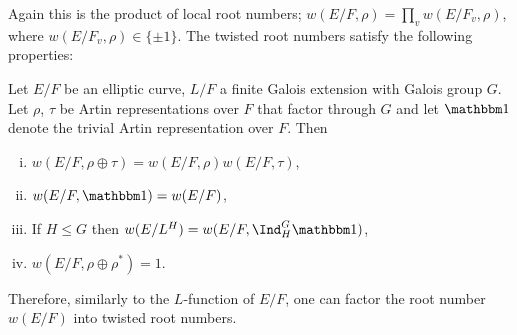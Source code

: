 Again this is the product of local root numbers; $w(E / F, \rho) = \prod_v w(E / F_v, \rho)$, where $w(E / F_v, \rho) \in \{ \pm 1\}$. The twisted root numbers satisfy the following properties:

\begin{prop}\cite[Lemma A.1, Proposition A.2]{reg-const}\label{compute-root-twist}
    Let $E / F$ be an elliptic curve, $L / F$ a finite Galois extension with Galois group $G$. Let $\rho$, $\tau$ be Artin representations over $F$ that factor through $G$ and let $\trivial$ denote the trivial Artin representation over $F$. Then
    \begin{enumerate}[(i)]
        \setlength\itemsep{0em}
        \item $w(E / F, \rho \oplus \tau) = w(E / F, \rho) w(E / F, \tau)$,
        \item $w(E / F, \trivial) = w(E/ F)$, 
        \item If $H \leq G$ then $w(E / L^H) = w(E/ F, \Ind_{H}^G \trivial)$, 
        \item $w(E / F, \rho \oplus \rho^*) = 1$.
    \end{enumerate}
\end{prop}

Therefore, similarly to the $L$-function of $E / F$, one can factor the root number $w(E / F)$ into twisted root numbers.
